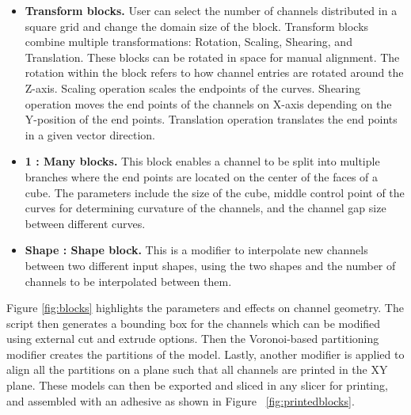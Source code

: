 \begin{itemize}[noitemsep, leftmargin=*]
\item \textbf{ Transform blocks.} User can select the number of channels distributed in a square grid and change the domain size of the block. Transform blocks combine multiple transformations: Rotation, Scaling, Shearing, and Translation. These blocks can be rotated in space  for manual alignment. The rotation within the block refers to  how channel entries are rotated around the Z-axis. Scaling operation scales the endpoints of the curves. Shearing operation moves the end points of the channels on X-axis depending on the Y-position of the end points. Translation operation translates the end points in a given vector direction.
\item \textbf{1 : Many blocks.} This block enables a channel to be split into multiple branches where the end points are located on the center of the faces of a cube. The parameters include the size of the cube, middle control point of the curves for determining curvature of the channels, and the channel gap size between different curves.
\item \textbf{Shape : Shape block.} This is a modifier to interpolate new channels between two different input shapes, using the two shapes and the number of channels to be interpolated between them.%
\end{itemize}

Figure \ref{fig:blocks} highlights the parameters and effects on channel geometry. 
The script then generates a bounding box for the channels which can be modified using external cut and extrude options. Then the Voronoi-based partitioning modifier creates the partitions of the model. Lastly, another modifier is applied to align all the partitions on a plane such that all channels are printed in the XY plane. These models can then be exported and sliced in any slicer for printing, and assembled with an adhesive as shown in Figure ~\ref{fig:printedblocks}.








